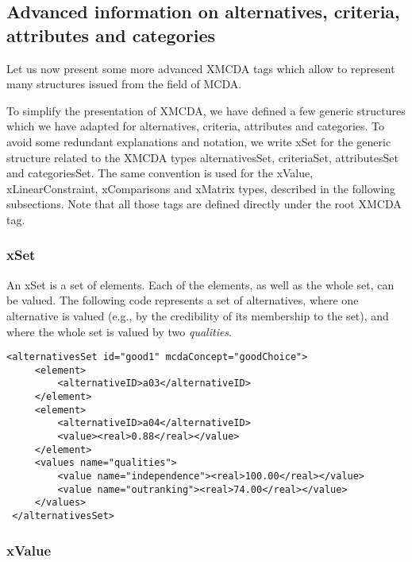 \documentclass[a4paper,oneside,10 pt]{article}
\newcommand{\XMCDA}{{\asciifamily XMCDA}\xspace}
\newcommand{\MCDA}{MCDA\xspace}
\newcommand{\code}{\asciifamily}
\begin{document}

\subsection{Advanced information on alternatives, criteria, attributes and categories}\label{sec:advancedTypes}

Let us now present some more advanced \XMCDA tags which allow to represent many structures issued from the field of \MCDA. 

To simplify the presentation of \XMCDA, we have defined a few generic structures which we have adapted for alternatives, criteria, attributes and categories. To avoid some redundant explanations and notation, we write {\code x}Set for the generic structure related to the \XMCDA types {\code alternativesSet}, {\code criteriaSet}, {\code attributesSet} and {\code categoriesSet}. The same convention is used for the {\code x}Value, {\code x}LinearConstraint, {\code x}Comparisons and {\code x}Matrix types, described in the following subsections. Note that all those tags are defined directly under the root \XMCDA tag.

\subsubsection{{\code x}Set}\label{subsec:xSet}

An {\code x}Set is a set of elements. Each of the elements, as well as the whole set, can be valued. The following code represents a set of alternatives, where one alternative is valued (e.g., by the credibility of its membership to the set), and where the whole set is valued by two {\em qualities}.

{\code
\begin{lstlisting}[style=prototype]
<alternativesSet id="good1" mcdaConcept="goodChoice">
	 <element>
		 <alternativeID>a03</alternativeID>
	 </element>
	 <element>
		 <alternativeID>a04</alternativeID>
		 <value><real>0.88</real></value>
	 </element>
	 <values name="qualities">
		 <value name="independence"><real>100.00</real></value>
		 <value name="outranking"><real>74.00</real></value>
	 </values>
 </alternativesSet>
\end{lstlisting}
} 

\subsubsection{{\code x}Value}
\end{document}

